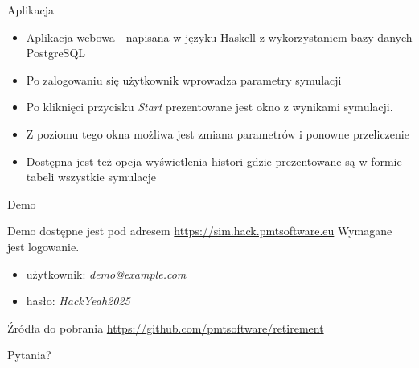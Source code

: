 \documentclass{beamer}
\begin{document}
    \begin{frame}[t]{Aplikacja} \vspace{4pt}
        \begin{itemize}
            \item Aplikacja webowa - napisana w języku Haskell z wykorzystaniem bazy danych PostgreSQL
            \item Po zalogowaniu się użytkownik wprowadza parametry symulacji
            \item Po kliknięci przycisku \textit{Start} prezentowane jest okno z wynikami symulacji.
            \item Z poziomu tego okna możliwa jest zmiana parametrów i ponowne przeliczenie
            \item Dostępna jest też opcja wyświetlenia histori gdzie prezentowane są w formie tabeli wszystkie symulacje
        \end{itemize}
    \end{frame}

    \begin{frame}[t]{Demo} \vspace{4pt}

        Demo dostępne jest pod adresem \href{https://sim.hack.pmtsoftware.eu}{https://sim.hack.pmtsoftware.eu}
        Wymagane jest logowanie.
        \begin{itemize}
            \item użytkownik: \textit{demo@example.com}
            \item hasło: \textit{HackYeah2025}
        \end{itemize}
        Źródła do pobrania \href{https://github.com/pmtsoftware/retirement}{https://github.com/pmtsoftware/retirement}

    \end{frame}

    \begin{frame}[standout]
        Pytania?
    \end{frame}
\end{document}

